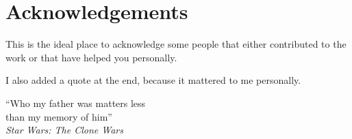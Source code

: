 \chapter*{Acknowledgements} %

This is the ideal place to acknowledge some people that either contributed to the work or that have helped you personally.

I also added a quote at the end, because it mattered to me personally.

\vspace{-10pt}
\begin{flushright}\small
``Who my father was matters less\\
than my memory of him''\\
\textit{Star Wars: The Clone Wars}
\end{flushright}